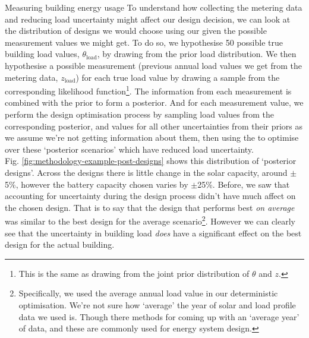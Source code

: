 \begin{ebox}[label=ebox:bayes]{Measuring building energy usage}
    To understand how collecting the metering data and reducing load uncertainty might affect our design decision, we can look at the distribution of designs we would choose using our  given the possible measurement values we might get. To do so, we hypothesise 50 possible true building load values, $\theta_{\text{load}}$, by drawing from the prior load distribution. We then hypothesise a possible measurement (previous annual load values we get from the metering data, $z_{\text{load}}$) for each true load value by drawing a sample from the corresponding likelihood function\footnote{This is the same as drawing from the joint prior distribution of $\theta$ and $z$.}. The information from each measurement is combined with the prior to form a posterior. And for each measurement value, we perform the design optimisation process by sampling load values from the corresponding posterior, and values for all other uncertainties from their priors as we assume we're not getting information about them, then using the  to optimise over these `posterior scenarios' which have reduced load uncertainty.\\

    Fig. \ref{fig:methodology-example-post-designs} shows this distribution of `posterior designs'. Across the designs there is little change in the solar capacity, around $\pm$5\%, however the battery capacity chosen varies by $\pm$25\%. Before, we saw that accounting for uncertainty during the design process didn't have much affect on the chosen design. That is to say that the design that performs best \textit{on average} was similar to the best design for the average scenario\footnote{Specifically, we used the average annual load value in our deterministic optimisation. We're not sure how `average' the year of solar and load profile data we used is. Though there methods for coming up with an `average year' of data, and these are commonly used for energy system design.}.
    However we can clearly see that the uncertainty in building load \textit{does} have a significant effect on the best design for the actual building.\\


\end{ebox}
